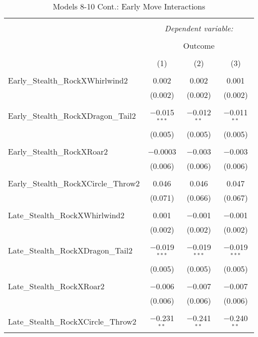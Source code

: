 \documentclass[12pt,twoside]{reedthesis}
\begin{document}
  \begin{table}[!htbp] \centering 
    \caption{Models 8-10 Cont.: Early Move Interactions} 
    \label{} 
  \begin{tabular}{@{\extracolsep{5pt}}lccc} 
  \\[-1.8ex]\hline 
  \hline \\[-1.8ex] 
   & \multicolumn{3}{c}{\textit{Dependent variable:}} \\ 
  \cline{2-4} 
  \\[-1.8ex] & \multicolumn{3}{c}{Outcome} \\ 
  \\[-1.8ex] & (1) & (2) & (3)\\ 
  \hline \\[-1.8ex] 
   Early\_Stealth\_RockXWhirlwind2 & 0.002 & 0.002 & 0.001 \\ 
    & (0.002) & (0.002) & (0.002) \\ 
    & & & \\ 
   Early\_Stealth\_RockXDragon\_Tail2 & $-$0.015$^{***}$ & $-$0.012$^{**}$ & $-$0.011$^{**}$ \\ 
    & (0.005) & (0.005) & (0.005) \\ 
    & & & \\ 
   Early\_Stealth\_RockXRoar2 & $-$0.0003 & $-$0.003 & $-$0.003 \\ 
    & (0.006) & (0.006) & (0.006) \\ 
    & & & \\ 
   Early\_Stealth\_RockXCircle\_Throw2 & 0.046 & 0.046 & 0.047 \\ 
    & (0.071) & (0.066) & (0.067) \\ 
    & & & \\ 
   Late\_Stealth\_RockXWhirlwind2 & 0.001 & $-$0.001 & $-$0.001 \\ 
    & (0.002) & (0.002) & (0.002) \\ 
    & & & \\ 
   Late\_Stealth\_RockXDragon\_Tail2 & $-$0.019$^{***}$ & $-$0.019$^{***}$ & $-$0.019$^{***}$ \\ 
    & (0.005) & (0.005) & (0.005) \\ 
    & & & \\ 
   Late\_Stealth\_RockXRoar2 & $-$0.006 & $-$0.007 & $-$0.007 \\ 
    & (0.006) & (0.006) & (0.006) \\ 
    & & & \\ 
   Late\_Stealth\_RockXCircle\_Throw2 & $-$0.231$^{**}$ & $-$0.241$^{**}$ & $-$0.240$^{**}$ \\ 

\end{tabular}
\end{table}
\end{document}

